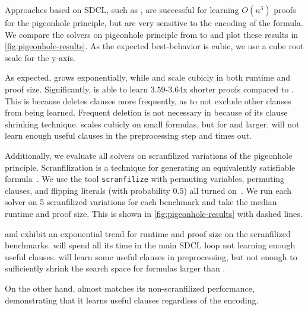 Approaches based on SDCL, such as \sadical, are successful for learning $O(n^3)$ proofs for the pigeonhole
principle, but are very sensitive to the encoding of the formula. We compare the solvers on
pigeonhole principle from  to  and plot these results in \autoref{fig:pigeonhole-results}. As the expected best-behavior is cubic, we use a cube root scale for the y-axis.

As expected, \cadical grows exponentially, while \sadical and \tool scale cubicly in both runtime and proof size. Significantly, \tool is able to learn $3.59$-$3.64$x shorter proofs compared to \sadical. 
This is because \sadical deletes clauses more frequently, as to not exclude other clauses from being learned. Frequent deletion is not necessary in \tool because of its clause shrinking technique.
\prelearn scales cubicly on small formulas, but for  and larger, will not learn enough useful \pr clauses in the preprocessing step and times out.


Additionally, we evaluate all solvers on scranfilized variations of the
pigeonhole principle. Scranfilization is a technique for generating an
equivalently satisfiable formula~\cite{scranfilize}. We use the tool
\texttt{scranfilize} with permuting variables, permuting clauses, and flipping literals (with probability $0.5$) all turned on~\cite{scranfilize}. We run each solver on 5 scranfilized variations for
each benchmark and take the median runtime and proof size. This is shown in \autoref{fig:pigeonhole-results} with dashed lines.

\sadical and \prelearn exhibit an exponential trend for runtime and proof size on the scranfilized benchmarks. \sadical will spend all its time in the main SDCL loop not learning enough useful clauses. \prelearn will learn some useful \pr clauses in preprocessing, but not enough to sufficiently shrink the search space for formulas larger than .

On the other hand, \tool almost matches its non-scranfilized performance, demonstrating that it learns useful \pr clauses regardless of the encoding.




